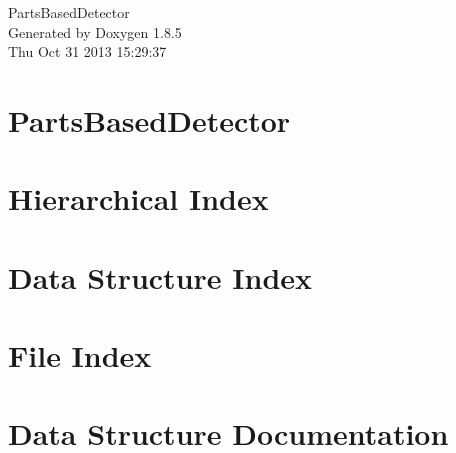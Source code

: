 \documentclass[twoside]{book}
\newcommand{\clearemptydoublepage}{%
  \newpage{\pagestyle{empty}\cleardoublepage}%
}
\begin{document}
\hypersetup{pageanchor=false}
\begin{titlepage}
\vspace*{7cm}
\begin{center}%
{\Large Parts\-Based\-Detector }\\
\vspace*{1cm}
{\large Generated by Doxygen 1.8.5}\\
\vspace*{0.5cm}
{\small Thu Oct 31 2013 15:29:37}\\
\end{center}
\end{titlepage}
\clearemptydoublepage
\tableofcontents
\clearemptydoublepage
{}
\hypersetup{pageanchor=true}

\chapter{Parts\-Based\-Detector}
\label{index}\hypertarget{index}{}
\chapter{Hierarchical Index}

\chapter{Data Structure Index}

\chapter{File Index}

\chapter{Data Structure Documentation}

























\end{document}
